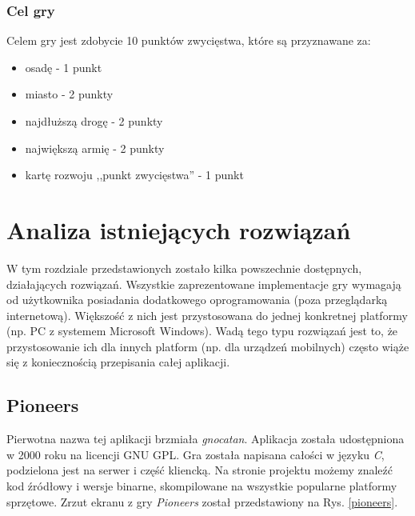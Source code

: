 \documentclass[a4paper,12pt]{article}
\providecommand{\imref}[1]{Rys. \ref{#1}} %
\begin{document}
\subsubsection{Cel gry}
Celem gry jest zdobycie 10 punktów zwycięstwa, które są przyznawane
za:

\begin{itemize}
\item osadę - 1 punkt
\item miasto - 2 punkty
\item najdłuższą drogę - 2 punkty
\item największą armię - 2 punkty
\item kartę rozwoju ,,punkt zwycięstwa'' - 1 punkt
\end{itemize}

\clearpage

\section{Analiza istniejących rozwiązań}
W tym rozdziale przedstawionych zostało kilka powszechnie dostępnych,
działających rozwiązań. Wszystkie zaprezentowane implementacje gry
wymagają od użytkownika posiadania dodatkowego oprogramowania (poza
przeglądarką internetową). Większość z nich jest przystosowana do
jednej konkretnej platformy (np. PC z systemem Microsoft
Windows). Wadą tego typu rozwiązań jest to, że przystosowanie ich dla
innych platform (np. dla urządzeń mobilnych) często wiąże się z
koniecznością przepisania całej aplikacji.

\subsection{Pioneers}
Pierwotna nazwa tej aplikacji brzmiała \emph{gnocatan}. Aplikacja
została udostępniona w 2000 roku na licencji GNU GPL. Gra została
napisana całości w języku \emph{C}, podzielona jest na serwer i część
kliencką. Na stronie projektu możemy znaleźć kod źródłowy i wersje
binarne, skompilowane na wszystkie popularne platformy
sprzętowe\cite{pioneers}. Zrzut ekranu z gry \emph{Pioneers} został
przedstawiony na \imref{pioneers}.
\end{document}
